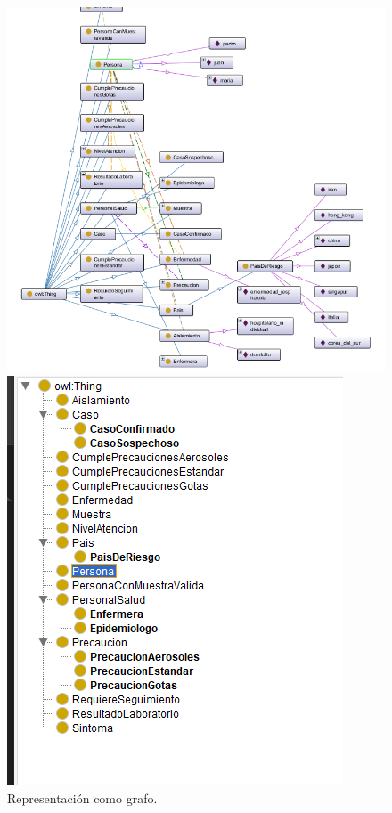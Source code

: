 \documentclass[11pt, letterpaper]{article}
\begin{document}
\begin{figure}[h!]
	\centering
	\begin{minipage}[t]{0.5\linewidth} %
		\centering
		\includegraphics[width=\linewidth]{IMG/R1}
		\caption{Representación como grafo.}
		\label{fig:r1}
	\end{minipage}%
	\hfill %
	\begin{minipage}[t]{0.5\linewidth} %
		\centering
		\includegraphics[width=\linewidth]{IMG/R2}

\end{minipage}
\end{figure}
\end{document}
